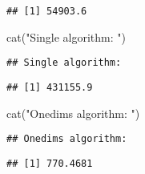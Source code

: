 \documentclass[
]{article}
\newenvironment{Shaded}{\begin{snugshade}}{\end{snugshade}}
\newcommand{\FunctionTok}[1]{\textcolor[rgb]{0.00,0.00,0.00}{#1}}
\newcommand{\NormalTok}[1]{#1}
\newcommand{\SpecialCharTok}[1]{\textcolor[rgb]{0.00,0.00,0.00}{#1}}
\newcommand{\StringTok}[1]{\textcolor[rgb]{0.31,0.60,0.02}{#1}}
\begin{document}
\begin{Shaded}
\end{Shaded}

\begin{verbatim}
## [1] 54903.6
\end{verbatim}

\begin{Shaded}
\begin{Highlighting}[]
\FunctionTok{cat}\NormalTok{(}\StringTok{"Single algorithm: "}\NormalTok{)}
\end{Highlighting}
\end{Shaded}

\begin{verbatim}
## Single algorithm:
\end{verbatim}

\begin{Shaded}
\end{Shaded}

\begin{verbatim}
## [1] 431155.9
\end{verbatim}

\begin{Shaded}
\begin{Highlighting}[]
\FunctionTok{cat}\NormalTok{(}\StringTok{"Onedims algorithm: "}\NormalTok{)}
\end{Highlighting}
\end{Shaded}

\begin{verbatim}
## Onedims algorithm:
\end{verbatim}

\begin{Shaded}
\end{Shaded}

\begin{verbatim}
## [1] 770.4681
\end{verbatim}
\end{document}
